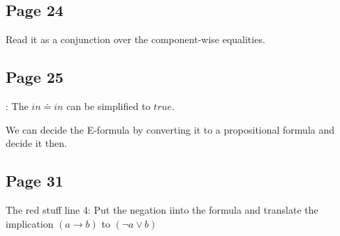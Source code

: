 \documentclass[a4paper]{article}
\begin{document}
\subsection{Page 24} Read it as a conjunction over the component-wise
equalities.

\subsection{Page 25}: The $in \doteq in$ can be simplified to $true$.

We can decide the E-formula by converting it to a propositional formula and
decide it then.


\subsection{Page 31}
The red stuff line 4: Put the negation iinto the formula and translate the
implication $( a \rightarrow b )$ to $(\neg a \vee b)$ 
\end{document}
